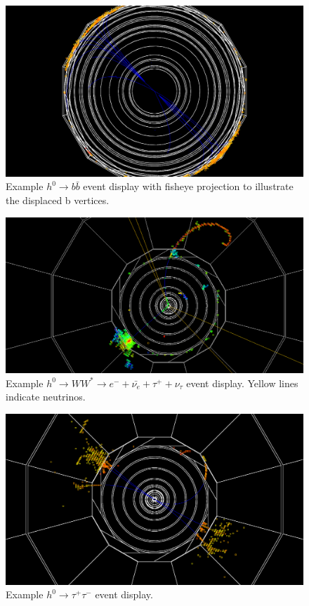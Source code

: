 \documentclass[a4paper]{article}
\begin{document}
\begin{figure}
	\includegraphics[width=\textwidth]{h-bbbar-vtex3}
	\caption{Example $h^0\rightarrow b\bar{b}$ event display with fisheye projection to illustrate the displaced b vertices.\label{fig:evt-disp-bbbar-fish}}
\end{figure}

\begin{figure}
	\includegraphics[width=\textwidth]{h-ww-e-tau-nunu}
	\caption{Example $h^0\rightarrow WW^*\rightarrow e^- + \bar{\nu_e} + \tau^+ + \nu_\tau$ event display. Yellow lines indicate neutrinos.\label{fig:evt-disp-ww-e-tau-nunu}}
\end{figure}

\begin{figure}
	\includegraphics[width=\textwidth]{h-tautau2}
	\caption{Example $h^0\rightarrow \tau^+\tau^-$ event display.\label{fig:evt-disp-tautau}}
\end{figure}

 


\end{document}
